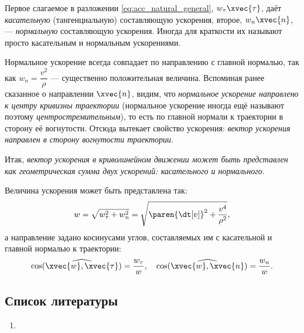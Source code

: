 Первое слагаемое в разложении \ref{eq:acc_natural_general}, $w_\tau \xvec{\tau}$,
даёт \textit{касательную} (тангенциальную) составляющую ускорения, второе, $w_n
\xvec{n}$, --- \textit{нормальную} составляющую ускорения. Иногда для краткости
их называют просто касательным и нормальным ускорениями.

Нормальное ускорение всегда совпадает по направлению с главной нормалью, так как
$w_n = \dfrac{v^2}{\rho}$ --- существенно положительная величина. Вспоминая
ранее сказанное о направлении $\xvec{n}$, видим, что \textit{нормальное ускорение
направлено к центру кривизны траектории} (нормальное ускорение иногда ещё
называют поэтому \textit{центростремительным}), то есть по главной нормали к
траектории в сторону её вогнутости. Отсюда вытекает свойство ускорения:
\textit{вектор ускорения направлен в сторону вогнутости траектории}.

Итак, \textit{вектор ускорения в криволинейном движении может быть представлен
как геометрическая сумма двух ускорений: касательного и нормального}.

Величина ускорения может быть представлена так:
\begin{equation}
  w = \sqrt{w_\tau^2 + w_n^2} =
    \sqrt{\paren{\dt[v]}^2 + \frac{v^4}{\rho^2}},
\end{equation}
а направление задано косинусами углов, составляемых им с касательной и главной
нормалью к траектории:
\begin{equation}
  \cos(\widehat{\xvec{w}, \xvec{\tau}}) = \frac{w_\tau}{w}, \quad
  \cos(\widehat{\xvec{w}, \xvec{n}}) = \frac{w_n}{w}.
\end{equation}

\subsection{Список литературы}
\begin{enumerate}
  \item \cite{lourie}
\end{enumerate}

